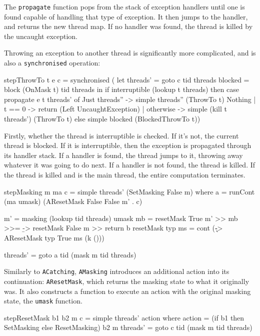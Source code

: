 The \verb|propagate| function pops from the stack of exception
handlers until one is found capable of handling that type of
exception. It then jumps to the handler, and returns the new thread
map. If no handler was found, the thread is killed by the uncaught
exception.

Throwing an exception to another thread is significantly more
complicated, and is also a \verb|synchronised| operation:

\begin{haskellcode}
stepThrowTo t e c = synchronised (
  let threads' = goto c tid threads
      blocked  = block (OnMask t) tid threads
  in if interruptible (lookup t threads)
     then case propagate e t threads' of
            Just threads'' -> simple threads'' (ThrowTo t)
            Nothing
              | t == 0 -> return (Left UncaughtException)
              | otherwise ->
                simple (kill t threads') (ThrowTo t)
     else simple blocked (BlockedThrowTo t))
\end{haskellcode}

Firstly, whether the thread is interruptible is checked. If it's not,
the current thread is blocked. If it is interruptible, then the
exception is propagated through its handler stack. If a handler is
found, the thread jumps to it, throwing away whatever it was going to
do next. If a handler is not found, the thread is killed. If the
thread is killed and is the main thread, the entire computation
terminates.

\begin{haskellcode}
stepMasking m ma c = simple threads' (SetMasking False m) where
  a = runCont (ma umask) (AResetMask False False m' . c)

  m' = masking (lookup tid threads)
  umask mb = resetMask True m' >> mb >>= \b -> resetMask False m >> return b
  resetMask typ ms = cont (\k -> AResetMask typ True ms (k ()))

  threads' = goto a tid (mask m tid threads)
\end{haskellcode}

Similarly to \verb|ACatching|, \verb|AMasking| introduces an
additional action into its continuation: \verb|AResetMask|, which
returns the masking state to what it originally was. It also
constructs a function to execute an action with the original masking
state, the \verb|umask| function.

\begin{haskellcode}
stepResetMask b1 b2 m c = simple threads' action where
  action   = (if b1 then SetMasking else ResetMasking) b2 m
  threads' = goto c tid (mask m tid threads)
\end{haskellcode}


